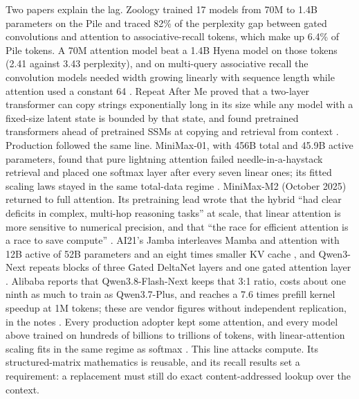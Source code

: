 Two papers explain the lag. Zoology trained 17 models from 70M to 1.4B parameters on the Pile and traced 82\% of the perplexity gap between gated convolutions and attention to associative-recall tokens, which make up 6.4\% of Pile tokens. A 70M attention model beat a 1.4B Hyena model on those tokens (2.41 against 3.43 perplexity), and on multi-query associative recall the convolution models needed width growing linearly with sequence length while attention used a constant 64 \cite{post15}. Repeat After Me proved that a two-layer transformer can copy strings exponentially long in its size while any model with a fixed-size latent state is bounded by that state, and found pretrained transformers ahead of pretrained SSMs at copying and retrieval from context \cite{post16}. Production followed the same line. MiniMax-01, with 456B total and 45.9B active parameters, found that pure lightning attention failed needle-in-a-haystack retrieval and placed one softmax layer after every seven linear ones; its fitted scaling laws stayed in the same total-data regime \cite{post13}. MiniMax-M2 (October 2025) returned to full attention. Its pretraining lead wrote that the hybrid ``had clear deficits in complex, multi-hop reasoning tasks'' at scale, that linear attention is more sensitive to numerical precision, and that ``the race for efficient attention is a race to save compute'' \cite{post14}. AI21's Jamba interleaves Mamba and attention with 12B active of 52B parameters and an eight times smaller KV cache \cite{post9}, and Qwen3-Next repeats blocks of three Gated DeltaNet layers and one gated attention layer \cite{post10}. Alibaba reports that Qwen3.8-Flash-Next keeps that 3:1 ratio, costs about one ninth as much to train as Qwen3.7-Plus, and reaches a 7.6 times prefill kernel speedup at 1M tokens; these are vendor figures without independent replication, \unverified{} in the notes \cite{post11,post12}. Every production adopter kept some attention, and every model above trained on hundreds of billions to trillions of tokens, with linear-attention scaling fits in the same regime as softmax \cite{post13}. This line attacks compute. Its structured-matrix mathematics is reusable, and its recall results set a requirement: a replacement must still do exact content-addressed lookup over the context.


